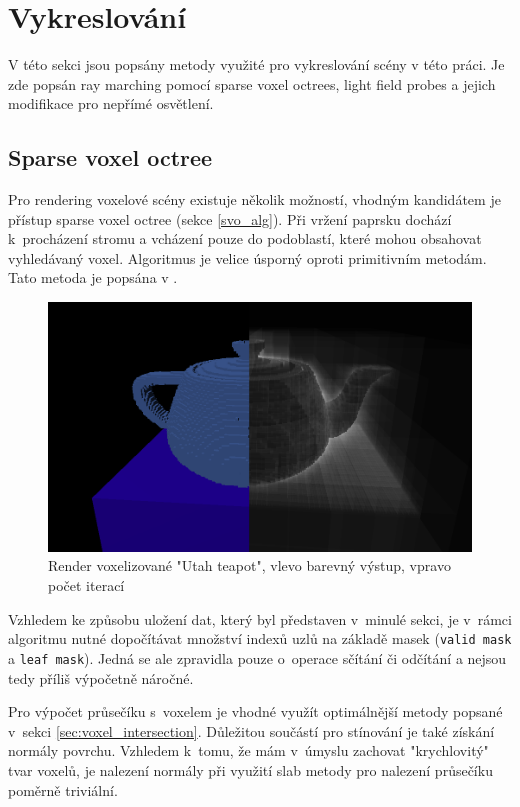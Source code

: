 \section{Vykreslování}\label{sec:rendering}
V této sekci jsou popsány metody využité pro vykreslování scény v této práci. Je zde popsán ray marching pomocí sparse voxel octrees, light field probes a jejich modifikace pro nepřímé osvětlení.

\subsection{Sparse voxel octree}
Pro rendering voxelové scény existuje několik možností, vhodným kandidátem je přístup sparse voxel octree (sekce \ref{svo_alg}). Při vržení paprsku dochází k~procházení stromu a vcházení pouze do podoblastí, které mohou obsahovat vyhledávaný voxel. Algoritmus je velice úsporný oproti primitivním metodám. Tato metoda je popsána v \cite{Laine2011EfficientSV}.

\begin{figure}[H]
	\centering
	\includegraphics[scale=1]{obrazky-figures/color_iter_svo.png}
	\caption{Render voxelizované "Utah teapot", vlevo barevný výstup, vpravo počet iterací }
	\label{fig:octree_child}
\end{figure}

Vzhledem ke způsobu uložení dat, který byl představen v~minulé sekci, je v~rámci algoritmu nutné dopočítávat množství indexů uzlů na základě masek (\texttt{valid mask} a \texttt{leaf mask}). Jedná se ale zpravidla pouze o~operace sčítání či odčítání a nejsou tedy příliš výpočetně náročné.

Pro výpočet průsečíku s~voxelem je vhodné využít optimálnější metody popsané v~sekci \ref{sec:voxel_intersection}. Důležitou součástí pro stínování je také získání normály povrchu. Vzhledem k~tomu, že mám v~úmyslu zachovat "krychlovitý" tvar voxelů, je nalezení normály při využití slab metody pro nalezení průsečíku poměrně triviální.

